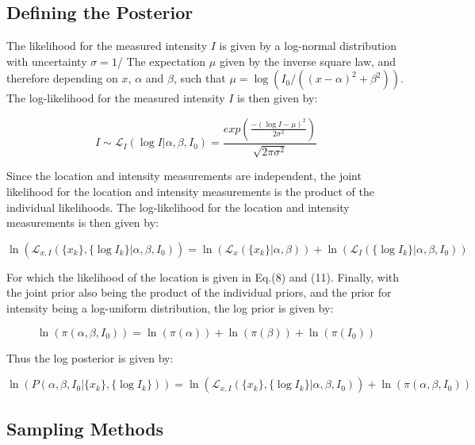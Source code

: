 \documentclass[12pt]{report} %
\begin{document}
\subsection*{Defining the Posterior}

The likelihood for the measured intensity $I$ is given by a log-normal distribution with uncertainty $\sigma = 1$/ The expectation $\mu$ given by the inverse square law, and therefore depending on $x$, $\alpha$ and $\beta$, such that $\mu = \log(I_{0}/((x - \alpha)^{2} + \beta^{2}))$. The log-likelihood for the measured intensity $I$ is then given by:

\begin{equation}
    I \sim \mathcal{L}_{I}(\log I | \alpha, \beta, I_{0}) = \frac{exp(\frac{-(\log I - \mu)^{2}}{2\sigma^{2}})}{\sqrt{2\pi\sigma^{2}}}
\end{equation}

Since the location and intensity measurements are independent, the joint likelihood for the location and intensity measurements is the product of the individual likelihoods. The log-likelihood for the location and intensity measurements is then given by:

\begin{equation}
    \ln(\mathcal{L}_{x, I}(\{x_{k}\}, \{\log I_{k}\} | \alpha, \beta, I_{0})) = \ln(\mathcal{L}_{x}(\{x_{k}\} | \alpha, \beta)) + \ln(\mathcal{L}_{I}(\{\log I_{k}\} | \alpha, \beta, I_{0}))
\end{equation}

For which the likelihood of the location is given in Eq.(8) and (11). Finally, with the joint prior also being the product of the individual priors, and the prior for intensity being a log-uniform distribution, the log prior is given by:

\begin{equation}
    \ln(\pi(\alpha, \beta, I_{0})) = \ln(\pi(\alpha)) + \ln(\pi(\beta)) + \ln(\pi(I_{0}))
\end{equation}

Thus the log posterior is given by:

\begin{equation}
    \ln(P(\alpha, \beta, I_{0} | \{x_{k}\}, \{\log I_{k}\})) = \ln(\mathcal{L}_{x, I}(\{x_{k}\}, \{\log I_{k}\} | \alpha, \beta, I_{0})) + \ln(\pi(\alpha, \beta, I_{0}))
\end{equation}

\subsection*{Sampling Methods}
\end{document}
